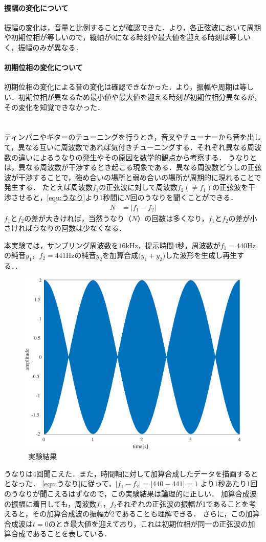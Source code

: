 \paragraph{振幅の変化について} 振幅の変化は，音量と比例することが確認できた．より，各正弦波において周期や初期位相が等しいので，縦軸が\(0\)になる時刻や最大値を迎える時刻は等しいく，振幅のみが異なる．
\paragraph{初期位相の変化について} 初期位相の変化による音の変化は確認できなかった．より，振幅や周期は等しい．初期位相が異なるため最小値や最大値を迎える時刻が初期位相分異なるが，その変化を知覚できなかった．
\section{\kadaiac}\label{sec:\kadaiac}
\purpose
ティンパニやギターのチューニングを行うとき，音叉やチューナーから音を出して，異なる互いに周波数であれば気付きチューニングする．それぞれ異なる周波数の違いによるうなりの発生やその原因を数学的観点から考察する．
\method
うなりとは，異なる周波数が干渉するとき起こる現象である．異なる周波数どうしの正弦波が干渉することで，強め合いの場所と弱め合いの場所が周期的に現れることで発生する．
たとえば周波数\(f_1\)の正弦波に対して周波数\(f_2(\neq f_1)\)の正弦波を干渉させると，\eqref{equ:うなり}より\(1\)秒間に\(N\)回のうなりを聞くことができる．
\begin{align}
    N & = \big|f_1-f_2\big|\label{equ:うなり}
\end{align}
\(f_1\)と\(f_2\)の差が大きければ，当然うなり（\(N\)）の回数は多くなり，\(f_1\)と\(f_2\)の差が小さければうなりの回数は少なくなる．\par
本実験では，サンプリング周波数を\(16\textrm{kHz}\)，提示時間\(4\)秒，周波数が\(f_1=440\textrm{Hz}\)の純音\(y_1\)，\(f_2=441\textrm{Hz}\)の純音\(y_2\)を加算合成\(\big(y_1+y_2\big)\)した波形を生成し再生する．\scall{}．

\begin{figure}
    \centering
    \includegraphics[keepaspectratio,width=.3\textwidth]{../../Figures/01_03.pdf}
    \caption{\kadaiac\ 実験結果}
    \label{fig:\kadaiac_実験結果}
\end{figure}
\result
うなりは4回聞こえた．また，時間軸に対して加算合成したデータを描画するととなった．
\consideration \eqref{equ:うなり}に従って，\(\big|f_1-f_2\big|= \big|440-441\big|=1\)
より\(1\)秒あたり\(1\)回のうなりが聞こえるはずなので，この実験結果は論理的に正しい．
加算合成波の振幅に着目しても，周波数\(f_1\)，\(f_2\)それぞれの正弦波の振幅が1であることを考えると，その加算合成波の振幅が2であることも理解できる．
さらに，この加算合成波は\(t=0\)のとき最大値を迎えており，これは初期位相が同一の正弦波の加算合成であることを表している．
